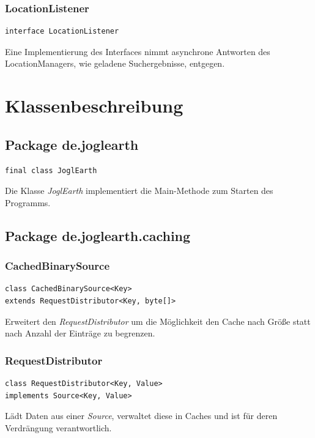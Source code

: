 \documentclass[10pt]{scrreprt}
\begin{document}
\vspace{5mm}
\subsection*{LocationListener}
\begin{lstlisting}
interface LocationListener
\end{lstlisting}
Eine Implementierung des Interfaces nimmt asynchrone Antworten des LocationManagers, wie geladene Suchergebnisse, entgegen.\\




\chapter{Klassenbeschreibung}
\section{Package de.joglearth}
\begin{lstlisting}
final class JoglEarth
\end{lstlisting}
Die Klasse \textit{JoglEarth} implementiert die Main-Methode zum Starten des Programms.\\

\vspace{5mm}
\section{Package de.joglearth.caching}
\subsection*{CachedBinarySource}
\begin{lstlisting}
class CachedBinarySource<Key>
extends RequestDistributor<Key, byte[]>
\end{lstlisting}
Erweitert den \textit{RequestDistributor} um die Möglichkeit den Cache nach Größe statt nach Anzahl der Einträge zu begrenzen.\\

\vspace{5mm}
\subsection*{RequestDistributor}
\begin{lstlisting}
class RequestDistributor<Key, Value>
implements Source<Key, Value>
\end{lstlisting}
Lädt Daten aus einer \textit{Source}, verwaltet diese in Caches und ist für deren Verdrängung verantwortlich.\\
\end{document}
